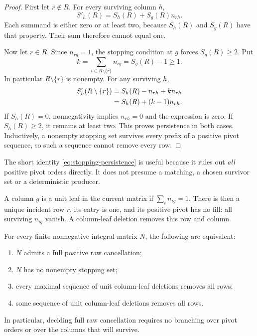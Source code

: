 \begin{proof}
First let $r\notin R$. For every surviving column $h$,
\[
 S'_h(R)=S_h(R)+S_g(R)n_{rh}.
\]
Each summand is either zero or at least two, because $S_h(R)$ and $S_g(R)$
have that property. Their sum therefore cannot equal one.

Now let $r\in R$. Since $n_{rg}=1$, the stopping condition at $g$ forces
$S_g(R)\ge2$. Put
\[
 k=\sum_{i\in R\setminus\{r\}}n_{ig}=S_g(R)-1\ge1.
\]
In particular $R\setminus\{r\}$ is nonempty. For any surviving $h$,
\begin{align}
 S'_h(R\setminus\{r\})
 &=S_h(R)-n_{rh}+k n_{rh}\notag\\
 &=S_h(R)+(k-1)n_{rh}.\label{eq:stopping-persistence}
\end{align}
If $S_h(R)=0$, nonnegativity implies $n_{rh}=0$ and the expression is zero.
If $S_h(R)\ge2$, it remains at least two. This proves persistence in both
cases. Inductively, a nonempty stopping set survives every prefix of a
positive pivot sequence, so such a sequence cannot remove every row.
\end{proof}

The short identity \eqref{eq:stopping-persistence} is useful because it
rules out \emph{all} positive pivot orders directly. It does not presume
a matching, a chosen survivor set or a deterministic producer.

\begin{definition}
A column $g$ is a unit leaf in the current matrix if
$\sum_i n_{ig}=1$. There is then a unique incident row $r$, its entry is
one, and its positive pivot has no fill: all surviving $n_{ig}$ vanish.
A column-leaf deletion removes this row and column.
\end{definition}

\begin{theorem}
\label{thm:complete}
For every finite nonnegative integral matrix $N$, the following are equivalent:
\begin{enumerate}[label=(\roman*)]
\item $N$ admits a full positive raw cancellation;
\item $N$ has no nonempty stopping set;
\item every maximal sequence of unit column-leaf deletions removes all rows;
\item some sequence of unit column-leaf deletions removes all rows.
\end{enumerate}
In particular, deciding full raw cancellation requires no branching over
pivot orders or over the columns that will survive.
\end{theorem}


